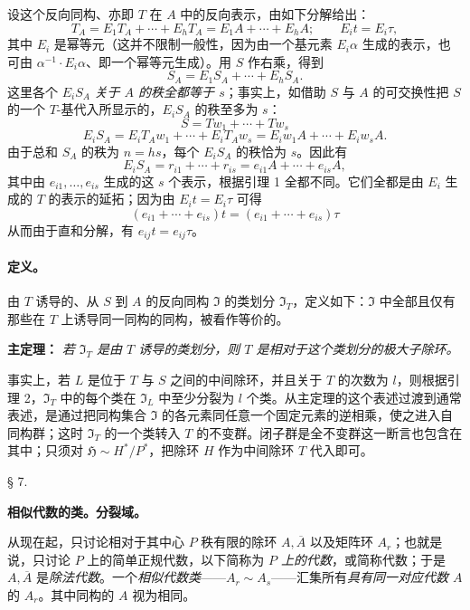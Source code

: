 \documentclass[11pt]{article}
\providecommand{\srcspaced}[1]{#1}
\begin{document}
设这个反向同构、亦即 \(T\) 在 \(A\) 中的反向表示，由如下分解给出：
\[
        T_A=E_1T_A+\cdots+E_hT_A
            =E_1A+\cdots+E_hA;\qquad E_it=E_i\tau,
\]
其中 \(E_i\) 是幂等元（这并不限制一般性，因为由一个基元素 \(E_i\alpha\) 生成的表示，也可由 \(\alpha^{-1}\cdot E_i\alpha\)、即一个幂等元生成）。用 \(S\) 作右乘，得到
\[
        S_A=E_1S_A+\cdots+E_hS_A .
\]
这里各个 \(E_iS_A\) \emph{关于 \(A\) 的秩全都等于 \(s\)}；事实上，如借助 \(S\) 与 \(A\) 的可交换性把 \(S\) 的一个 \(T\)-基代入所显示的，\(E_iS_A\) 的秩至多为 \(s\)：
\[
        S=Tw_1+\cdots+Tw_s
\]
\[
        E_iS_A=E_iT_Aw_1+\cdots+E_iT_Aw_s
              =E_iw_1A+\cdots+E_iw_sA .
\]
由于总和 \(S_A\) 的秩为 \(n=hs\)，每个 \(E_iS_A\) 的秩恰为 \(s\)。因此有
\[
        E_iS_A=r_{i1}+\cdots+r_{is}
              =e_{i1}A+\cdots+e_{is}A,
\]
其中由 \(e_{i1},\ldots,e_{is}\) 生成的这 \(s\) 个表示，根据引理 1 全都不同。它们全都是由 \(E_i\) 生成的 \(T\) 的表示的延拓；因为由 \(E_it=E_i\tau\) 可得
\[
        (e_{i1}+\cdots+e_{is})t=(e_{i1}+\cdots+e_{is})\tau
\]
从而由于直和分解，有 \(e_{ij}t=e_{ij}\tau\)。

\paragraph{定义。}
由 \(T\) 诱导的、从 \(S\) 到 \(A\) 的反向同构 \(\mathfrak I\) 的类划分 \(\mathfrak I_T\)，定义如下：\(\mathfrak I\) 中全部且仅有那些在 \(T\) 上诱导同一同构的同构，被看作等价的。

\noindent\textbf{\srcspaced{主定理：}} \emph{若 \(\mathfrak I_T\) 是由 \(T\) 诱导的类划分，则 \(T\) 是相对于这个类划分的极大子除环。}

事实上，若 \(L\) 是位于 \(T\) 与 \(S\) 之间的中间除环，并且关于 \(T\) 的次数为 \(l\)，则根据引理 2，\(\mathfrak I_T\) 中的每个类在 \(\mathfrak I_L\) 中至少分裂为 \(l\) 个类。从主定理的这个表述过渡到通常表述，是通过把同构集合 \(\mathfrak I\) 的各元素同任意一个固定元素的逆相乘，使之进入自同构群；这时 \(\mathfrak I_T\) 的一个类转入 \(T\) 的不变群。闭子群是全不变群这一断言也包含在其中；只须对 \(\mathfrak H\sim H^*/P^*\)，把除环 \(H\) 作为中间除环 \(T\) 代入即可。
\begin{center}
§ 7.

\textbf{\srcspaced{相似代数的类。分裂域。}}
\end{center}

从现在起，只讨论相对于其中心 \(P\) 秩有限的除环 \(A,\overline A\) 以及矩阵环 \(A_r\)；也就是说，只讨论 \(P\) 上的简单正规代数，以下简称为 \emph{\(P\) 上的代数}，或简称代数；于是 \(A,\overline A\) 是\emph{除法代数}。一个\emph{相似代数类}——\(A_r\sim A_s\)——汇集所有\emph{具有同一对应代数 \(A\)} 的 \(A_r\)。其中同构的 \(A\) 视为相同。
\end{document}
